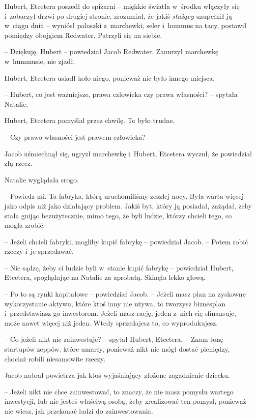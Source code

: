 \documentclass[oneside,polish,11pt,sfheadings]{mwbk}
\begin{document}
Hubert, Etcetera poszedł do spiżarni -- miękkie światła w~środku włączyły
się i~zobaczył drzwi po drugiej stronie, zrozumiał, że jakiś
\textit{służący} uzupełnił ją w~ciągu dnia -- wyniósł paluszki z~marchewki,
seler i~hummus na tacy, postawił pomiędzy obojgiem Redwater. Patrzyli
się na siebie.

-- Dziękuję, Hubert -- powiedział Jacob Redwater. Zanurzył marchewkę w~hummusie, nie zjadł.

Hubert, Etcetera usiadł koło niego, ponieważ nie było innego miejsca.

-- Hubert, co jest ważniejsze, prawa człowieka czy prawa własności? -- spytała Natalie.

Hubert, Etcetera pomyślał przez chwilę. To było trudne. 

-- Czy prawo
własności jest prawem człowieka?

Jacob uśmiechnął się, ugryzł marchewkę i~Hubert, Etcetera wyczuł, że
powiedział złą rzecz.

Natalie wyglądała srogo.

-- Powiedz mi. Ta fabryka, którą
uruchomiliśmy zeszłej nocy. Była warta więcej jako odpis niż jako
działający problem. Jakiś byt, który ją posiadał, zażądał, żeby stała
gnijąc bezużytecznie, mimo tego, że byli ludzie, którzy chcieli tego, co
mogła zrobić.

-- Jeżeli chcieli fabryki, mogliby kupić fabrykę -- powiedział Jacob. -- Potem robić rzeczy i~je sprzedawać.

-- Nie sądzę, żeby ci ludzie byli w~stanie kupić fabrykę -- powiedział
Hubert, Etcetera, spoglądając na Natalie za aprobatą. Skinęła lekko
głową.

-- Po to są rynki kapitałowe -- powiedział Jacob. -- Jeżeli masz plan na
zyskowne wykorzystanie aktywu, które ktoś inny nie używa, to tworzysz
biznesplan i~przedstawiasz go inwestorom. Jeżeli masz rację, jeden z~nich cię sfinansuje, może nawet więcej niż jeden. Wtedy sprzedajesz to,
co wyprodukujesz.

-- Co jeżeli nikt nie zainwestuje? -- spytał Hubert, Etcetera. -- Znam tonę
startupów zeppów, które umarły, ponieważ nikt nie mógł dostać pieniędzy,
chociaż robili niesamowite rzeczy.

Jacob nabrał powietrza jak ktoś wyjaśniający złożone zagadnienie
dziecku. 

-- Jeżeli nikt nie chce zainwestować, to znaczy, że nie masz
pomysłu wartego inwestycji, lub nie jesteś właściwą osobą, żeby
zrealizować ten pomysł, ponieważ nie wiesz, jak przekonać ludzi do
zainwestowania.
\end{document}

